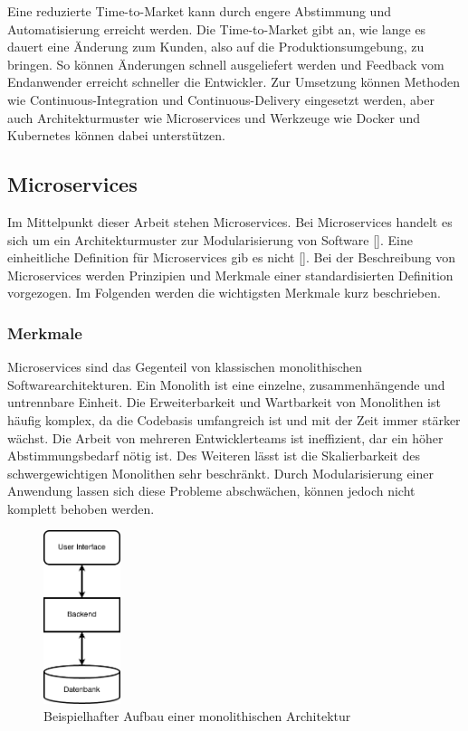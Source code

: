 Eine reduzierte Time-to-Market kann durch engere Abstimmung und Automatisierung erreicht werden. Die Time-to-Market gibt an, wie lange es dauert eine Änderung zum Kunden, also auf die Produktionsumgebung, zu bringen. So können Änderungen schnell ausgeliefert werden und Feedback vom Endanwender erreicht schneller die Entwickler. Zur Umsetzung können Methoden wie Continuous-Integration und Continuous-Delivery eingesetzt werden, aber auch Architekturmuster wie Microservices und Werkzeuge wie Docker und Kubernetes können dabei unterstützen.

\subsection{Microservices}

Im Mittelpunkt dieser Arbeit stehen Microservices. Bei Microservices handelt es sich um ein Architekturmuster zur Modularisierung von Software [\cite[S. 15]{newmanMicroservices2015}]. Eine einheitliche Definition für Microservices gib es nicht [\cite[S. 2]{wolffMicroservices2018}]. Bei der Beschreibung von Microservices werden Prinzipien und Merkmale einer standardisierten Definition vorgezogen. Im Folgenden werden die wichtigsten Merkmale kurz beschrieben.

\subsubsection{Merkmale}

Microservices sind das Gegenteil von klassischen monolithischen Softwarearchitekturen. Ein Monolith ist eine einzelne, zusammenhängende und untrennbare Einheit. Die Erweiterbarkeit und Wartbarkeit von Monolithen ist häufig komplex, da die Codebasis umfangreich ist und mit der Zeit immer stärker wächst. Die Arbeit von mehreren Entwicklerteams ist ineffizient, dar ein höher Abstimmungsbedarf nötig ist. Des Weiteren lässt ist die Skalierbarkeit des schwergewichtigen Monolithen sehr beschränkt. Durch Modularisierung einer Anwendung lassen sich diese Probleme abschwächen, können jedoch nicht komplett behoben werden.

\begin{figure}[H] 
    \centering
    \includegraphics[width=0.2\textwidth]{figures/Monolith.png}
    \caption{Beispielhafter Aufbau einer monolithischen Architektur}
\end{figure}

